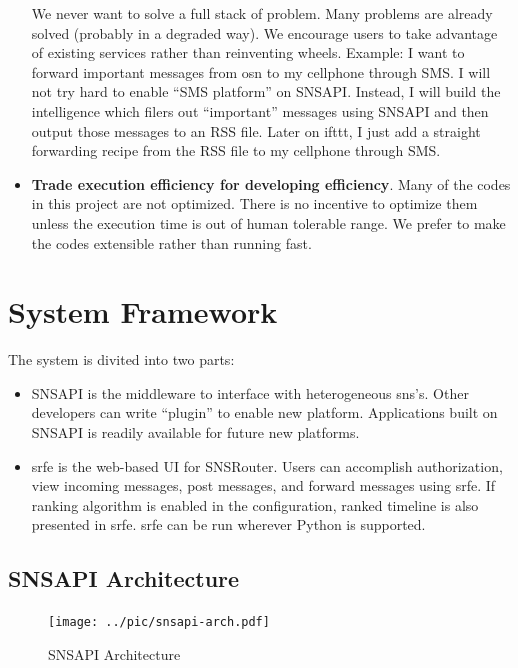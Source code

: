 \documentclass{sig-alternate}
\begin{document}
\begin{itemize}
		We never want to solve a full stack of problem. 
		Many problems are already solved (probably in a degraded way). 
		We encourage users to take advantage of existing services
		rather than reinventing wheels. 
		Example: I want to forward important messages from \gls{osn} to 
		my cellphone through SMS. 
		I will not try hard to enable ``SMS platform'' on SNSAPI. 
		Instead, I will build the intelligence which filers out ``important'' messages using SNSAPI
		and then output those messages to an RSS file. 
		Later on ifttt, I just add a straight forwarding recipe from the RSS file 
		to my cellphone through SMS. 
	\item \textbf{Trade execution efficiency for developing efficiency}. 
		Many of the codes in this project are not optimized. 
		There is no incentive to optimize them unless the execution 
		time is out of human tolerable range. 
		We prefer to make the codes extensible rather than running fast. 
\end{itemize}

\section{System Framework}
\label{sec:System Framework}

The system is divited into two parts:
\begin{itemize}
	\item SNSAPI is the middleware to interface with 
		heterogeneous \gls{sns}'s. 
		Other developers can write ``plugin'' to enable new platform. 
		Applications built on SNSAPI is readily available for future new platforms. 
	\item \gls{srfe} is the web-based UI for SNSRouter. 
		Users can accomplish authorization, view incoming messages, post messages, 
		and forward messages using \gls{srfe}. 
		If ranking algorithm is enabled in the configuration, 
		ranked timeline is also presented in \gls{srfe}. 
		\gls{srfe} can be run wherever Python is supported. 
\end{itemize}

\subsection{SNSAPI Architecture}
\label{sec:SNSAPI Architecture}


\begin{figure}[t!]
	\centering
	\texttt{[image: ../pic/snsapi-arch.pdf]}
	\caption{SNSAPI Architecture}
	\label{fig:snsapi-arch}
\end{figure}
\end{document}
